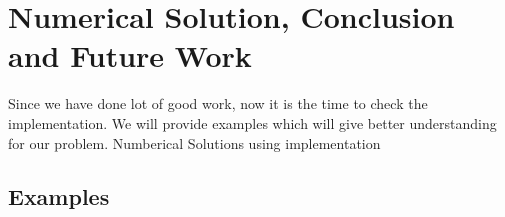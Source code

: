 \chapter{Numerical Solution, Conclusion and Future Work}
Since we have done lot of good work, now it is the time to check the implementation.
We will provide examples which will give better understanding for our problem.
{Numberical Solutions using implementation}
\section{Examples}
